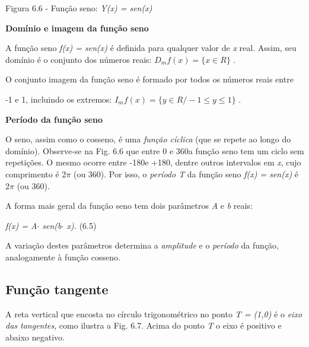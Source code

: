 Figura 6.6 - Função seno: \textit{Y(x) = sen(x)}

\textbf{Domínio e imagem da função seno}

A função seno \textit{f(x) = sen(x) }é definida para qualquer valor de \textit{x} real. Assim, seu domínio é o conjunto dos números reais:  \( D_{m}f \left( x \right) = \{ x \in  R \}  \) .

O conjunto imagem da função seno é formado por todos os números reais entre

-1 e 1, incluindo os extremos:  \( I_{m}f \left( x \right) = \{ y \in  R/ -1 \leq y \leq 1 \}  \) .

\textbf{Período da função seno}

O seno, assim como o cosseno, é uma \textit{função cíclica} (que se repete ao longo do domínio). Observe-se na Fig. 6.6 que entre 0 e 360\degree a função seno tem um ciclo sem repetições. O mesmo ocorre entre -180\degree e +180\degree, dentre outros intervalos em \textit{x}, cujo comprimento é 2$ \pi $   (ou 360\degree). Por isso, o \textit{período T} da função seno\textit{ f(x) = sen(x) } é 2$ \pi $   (ou 360\degree). 

A forma mais geral da função seno tem dois parâmetros \textit{A }e\textit{ b} reais:

\textit{f(x) = A$ \cdot $ sen(b$ \cdot $ x).  \tab \tab \tab \tab \tab   }(6.5)

A variação destes parâmetros determina a \textit{amplitude} e o \textit{período} da função, analogamente à função cosseno.

\subsection{Função tangente}

A reta vertical que encosta no círculo trigonométrico no ponto \textit{T = (1,0)} é o \textit{eixo das tangentes}, como ilustra a Fig. 6.7. Acima do ponto \textit{T} o eixo é positivo e abaixo negativo.

